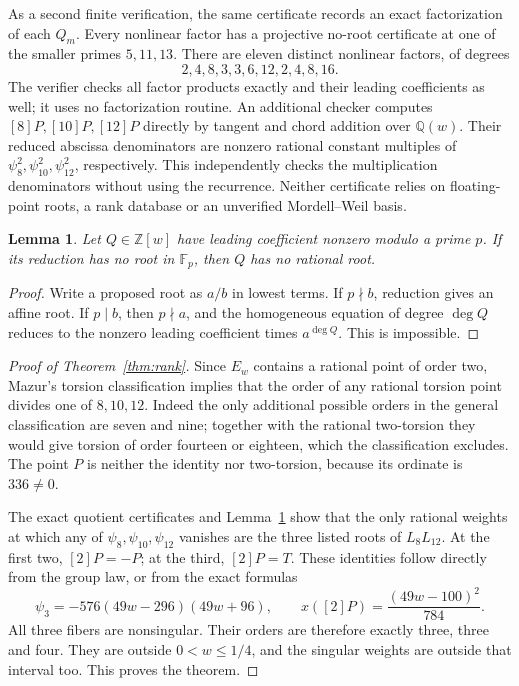\documentclass[11pt,a4paper]{article}
\newtheorem{lemma}[theorem]{Lemma}
\newcommand{\Q}{\mathbb Q}\newcommand{\Z}{\mathbb Z}\newcommand{\R}{\mathbb R}
\begin{document}
As a second finite verification, the same certificate records an exact
factorization of each \(Q_m\). Every nonlinear factor has a projective
no-root certificate at one of the smaller primes \(5,11,13\).
There are eleven distinct nonlinear factors, of degrees
\[
                 2,4,8,3,3,6,12,2,4,8,16.
\]
The verifier checks all factor products exactly and their leading
coefficients as well; it uses no factorization routine. An additional checker computes $[8]P,[10]P,[12]P$ directly by
tangent and chord addition over $\Q(w)$. Their reduced abscissa
denominators are nonzero rational constant multiples of
$\psi_8^2,\psi_{10}^2,\psi_{12}^2$, respectively. This independently
checks the multiplication denominators without using the recurrence.
Neither certificate relies on floating-point roots, a rank database or an
unverified Mordell--Weil basis.

\begin{lemma}\label{lem:projective}
Let \(Q\in\Z[w]\) have leading coefficient nonzero modulo a prime
\(p\). If its reduction has no root in \(\mathbb F_p\), then
\(Q\) has no rational root.
\end{lemma}
\begin{proof}
Write a proposed root as \(a/b\) in lowest terms. If \(p\nmid b\),
reduction gives an affine root. If \(p\mid b\), then \(p\nmid a\),
and the homogeneous equation of degree \(\deg Q\) reduces to the
nonzero leading coefficient times \(a^{\deg Q}\). This is impossible.
\end{proof}

\begin{proof}[Proof of Theorem~\ref{thm:rank}]
Since \(E_w\) contains a rational point of order two, Mazur's torsion
classification \cite[Theorem 8; III, Theorem 5.1]{Mazur} implies that the order of any
rational torsion point divides one of \(8,10,12\). Indeed the only
additional possible orders in the general classification are seven
and nine; together with the rational two-torsion they would give
torsion of order fourteen or eighteen, which the classification excludes.
The point \(P\) is neither the identity nor two-torsion, because its
ordinate is \(336\ne0\).

The exact quotient certificates and Lemma~\ref{lem:projective} show
that the only rational weights at which any of
\(\psi_8,\psi_{10},\psi_{12}\) vanishes are the three listed roots
of \(L_8L_{12}\). At the first two, \([2]P=-P\); at the third,
\([2]P=T\). These identities follow directly from the group law,
or from the exact formulas
\[
 \psi_3=-576(49w-296)(49w+96),\qquad
                         x([2]P)=\frac{(49w-100)^2}{784}.
\]
All three fibers are nonsingular. Their orders are therefore exactly
three, three and four. They are outside \(0<w\le1/4\), and the
singular weights are outside that interval too. This proves the theorem.
\end{proof}
\end{document}
